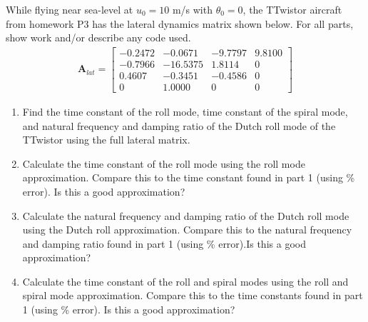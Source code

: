 \begin{question}
    While flying near sea-level at $u_0 = 10$ m/s with $\theta_0 = 0$, the TTwistor aircraft from homework P3 has the lateral dynamics matrix shown below. For all parts, show work and/or describe any code used.
    \begin{align*}
        \mathbf{A}_{lat} = 
        \begin{bmatrix}
         -0.2472 & -0.0671 & -9.7797 & 9.8100 \\
         -0.7966 & -16.5375 & 1.8114 & 0 \\
         0.4607 & -0.3451 & -0.4586 &  0 \\
         0 & 1.0000 & 0 & 0
        \end{bmatrix}
    \end{align*}
    \begin{enumerate}
        \item Find the time constant of the roll mode, time constant of the spiral mode, and natural frequency and damping ratio of the Dutch roll mode of the TTwistor using the full lateral matrix.
        \item Calculate the time constant of the roll mode using the roll mode approximation. Compare this to the time constant found in part 1 (using \% error). Is this a good approximation?
        \item Calculate the natural frequency and damping ratio of the Dutch roll mode using the Dutch roll approximation. Compare this to the natural frequency and damping ratio found in part 1 (using \% error).Is this a good approximation?
        \item Calculate the time constant of the roll and spiral modes using the roll and spiral mode approximation. Compare this to the time constants found in part 1 (using \% error). Is this a good approximation?
    \end{enumerate}

\end{question}